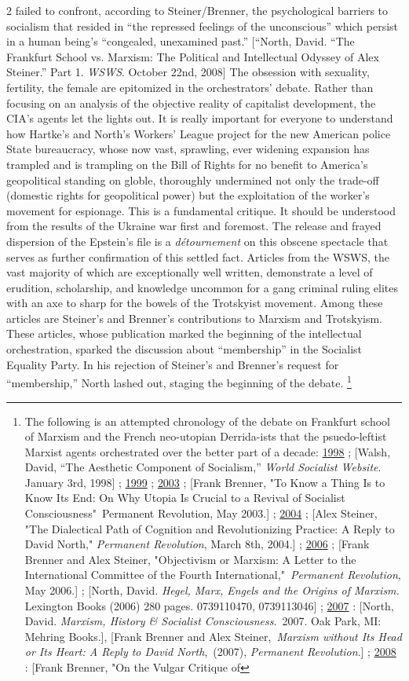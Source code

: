 \documentclass[10pt,a4paper,twoside]{article} %
\begin{document}
\begin{multicols}{2}
{failed to confront, according to Steiner/Brenner, the psychological barriers to socialism that resided in “the repressed feelings of the unconscious” which persist in a human being’s “congealed, unexamined past.” [“North, David. “The Frankfurt School vs. Marxism: The Political and Intellectual Odyssey of Alex Steiner.” Part 1. \emph{WSWS}. October 22nd, 2008] The obsession with sexuality, fertility, the female are epitomized in the orchestrators’ debate. Rather than focusing on an analysis of the objective reality of capitalist development, the CIA’s agents let the lights out. It is really important for everyone to understand how Hartke’s and North’s Workers’ League project for the new American police State bureaucracy, whose now vast, sprawling, ever widening expansion has trampled and is trampling on the Bill of Rights for no benefit to America’s geopolitical standing on globle, thoroughly undermined not only the trade-off (domestic rights for geopolitical power) but the exploitation of the worker’s movement for espionage. This is a fundamental critique. It should be understood from the results of the Ukraine war first and foremost. The release and frayed dispersion of the Epstein’s file is a \emph{détournement} on this obscene spectacle that serves as further confirmation of this settled fact.} Articles from the WSWS, the vast majority of which are exceptionally well written, demonstrate a level of erudition, scholarship, and knowledge uncommon for a gang criminal ruling elites with an axe to sharp for the bowels of the Trotskyist movement. Among these articles are Steiner’s and Brenner’s contributions to Marxism and Trotskyism. These articles, whose publication marked the beginning of the intellectual orchestration, sparked the discussion about “membership” in the Socialist Equality Party.  In his rejection of Steiner’s and Brenner’s request for “membership,” North lashed out, staging the beginning of the debate.  \footnote{The following is an attempted chronology of the debate on Frankfurt school of Marxism and the French neo-utopian Derrida-ists that the psuedo-leftist Marxist agents orchestrated over the better part of a decade: \underline{1998} ; [Walsh, David, “The Aesthetic Component of Socialism,” \emph{World Socialist Website}. January 3rd, 1998] ; \underline{1999} ; \underline{2003} ; [Frank Brenner, "To Know a Thing Is to Know Its End: On Why Utopia Is Crucial to a Revival of Socialist Consciousness" Permanent Revolution, May 2003.] ; \underline{2004} ; [Alex Steiner, "The Dialectical Path of Cognition and Revolutionizing Practice: A Reply to David North," \emph{Permanent Revolution}, March 8th, 2004.] ; \underline{2006} ; [Frank Brenner and Alex Steiner, "Objectivism or Marxism: A Letter to the International Committee of the Fourth International," \emph{Permanent Revolution}, May 2006.] ; [North, David. \emph{Hegel, Marx, Engels and the Origins of Marxism.} Lexington Books (2006) 280 pages. 0739110470, 0739113046] ; \underline{2007} : [North, David. \emph{Marxism, History & Socialist Consciousness}. 2007. Oak Park, MI: Mehring Books.], [Frank Brenner and Alex Steiner, \emph{Marxism without Its Head or Its Heart: A Reply to David North}, (2007), \emph{Permanent Revolution}.] ; \underline{2008} : [Frank Brenner, "On the Vulgar Critique of }
\end{multicols}
\end{document}
